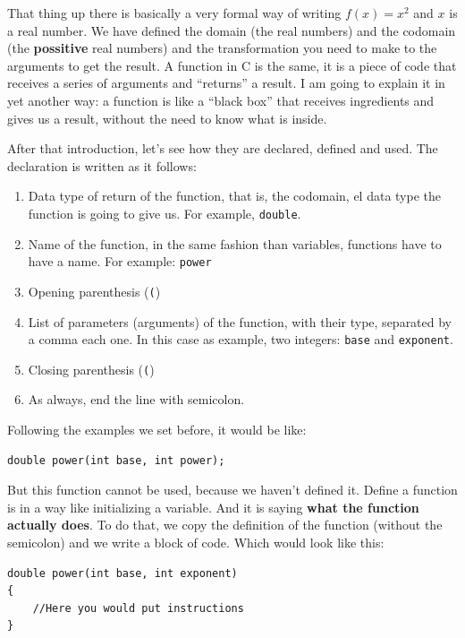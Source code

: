 \documentclass[a4paper]{article}
\begin{document}
That thing up there is basically a very formal way of writing $f(x) = x^2$
and $x$ is a real number. We have defined the domain (the real numbers) and the
codomain (the \textbf{possitive} real numbers) and the transformation you need
to make to the arguments to get the result. A function in C is the same, it is
a piece of code that receives a series of arguments and ``returns'' a result.
I am going to explain it in yet another way: a function is like a ``black box''
that receives ingredients and gives us a result, without the need to know what
is inside.

After that introduction, let's see how they are declared, defined and used.
The declaration is written as it follows:
\begin{enumerate}
\item Data type of return of the function, that is, the codomain, el data type
the function is going to give us. For example, \lstinline[style=C]{double}.
\item Name of the function, in the same fashion than variables, functions have
to have a name. For example: \verb!power!
\item Opening parenthesis (\texttt{(})
\item List of parameters (arguments) of the function, with their type, separated
by a comma each one. In this case as example, two integers: \verb!base! and
\verb!exponent!.
\item Closing parenthesis (\texttt{(})
\item As always, end the line with semicolon.
\end{enumerate}

Following the examples we set before, it would be like:

\noindent
\begin{minipage}[H]{\linewidth}
\mbox{}
\begin{lstlisting}[style=C, label={lst:functionDeclaration},
caption={Function declaration in C}]
double power(int base, int power);
\end{lstlisting}
\end{minipage}

But this function cannot be used, because we haven't defined it. Define a
function is in a way like initializing a variable. And it is saying
\textbf{what the function actually does}. To do that, we copy the definition of
the function (without the semicolon) and we write a block of code. Which would
look like this:

\noindent
\begin{minipage}[H]{\linewidth}
\mbox{}
\begin{lstlisting}[style=C, label={lst:functionDefinition},
caption={Definition of a function in C}]
double power(int base, int exponent)
{
    //Here you would put instructions
}
\end{lstlisting}
\end{minipage}
\end{document}

